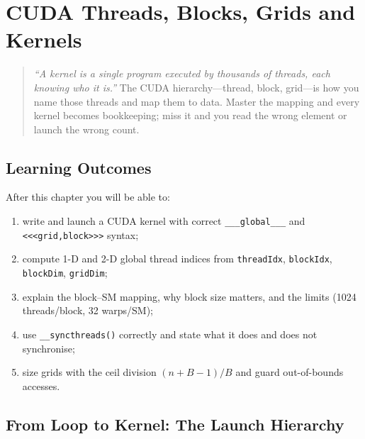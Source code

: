 \chapter{CUDA Threads, Blocks, Grids and Kernels}
\label{ch:cuda}
\sloppy

\begin{quote}
\emph{``A kernel is a single program executed by thousands of threads, each knowing who it is.''} The CUDA hierarchy---thread, block, grid---is how you name those threads and map them to data. Master the mapping and every kernel becomes bookkeeping; miss it and you read the wrong element or launch the wrong count.
\end{quote}

\noindent{}
\vspace{0.4em}

\section*{Learning Outcomes}
After this chapter you will be able to:
\begin{enumerate}[label=(L\arabic*)]
    \item write and launch a CUDA kernel with correct \texttt{\_\_\_global\_\_\_} and \texttt{<<<grid,block>>>} syntax;
    \item compute 1-D and 2-D global thread indices from \texttt{threadIdx}, \texttt{blockIdx}, \texttt{blockDim}, \texttt{gridDim};
    \item explain the block--SM mapping, why block size matters, and the limits (1024 threads/block, 32 warps/SM);
    \item use \texttt{\_\_syncthreads()} correctly and state what it does and does not synchronise;
    \item size grids with the ceil division $(n+B-1)/B$ and guard out-of-bounds accesses.
\end{enumerate}

\section{From Loop to Kernel: The Launch Hierarchy}
\label{sec:launch-hierarchy}
